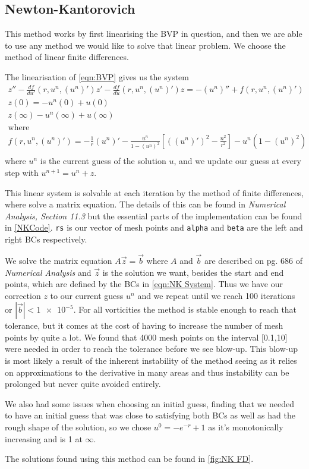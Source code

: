\documentclass[12pt]{article}
\numberwithin{equation}{section}
\numberwithin{figure}{section}
\numberwithin{table}{section}
\begin{document}
\subsection{Newton-Kantorovich}
\par This method works by first linearising the BVP in question, and then we are able to use any method we would like to solve that linear problem. We choose the method of linear finite differences. 
\par The linearisation of \autoref{eqn:BVP} gives us the system
\begin{equation}
    \begin{gathered}
        z''-\frac{df}{du'}(r,u^n, (u^n)')z'-\frac{df}{du}(r,u^n, (u^n)')z=-(u^n)''+f(r,u^n, (u^n)')\\
        z(0)=-u^n(0)+u(0)\\
        z(\infty)-u^n(\infty)+u(\infty)\\
        \text{where}\\
        f(r,u^n, (u^n)')=-\frac{1}{r}(u^n)'-\frac{u^n}{1-(u^n)^2}\left[\left((u^n)'\right)^2-\frac{n^2}{r^2}\right]-u^n(1-(u^n)^2)\\
    \end{gathered}
    \label{eqn:NK System}
\end{equation}
where $u^n$ is the current guess of the solution $u$, and we update our guess at every step with $u^{n+1}=u^n+z$. 
\par This linear system is solvable at each iteration by the method of finite differences, where solve a matrix equation. The details of this can be found in \textit{Numerical Analysis, Section 11.3} \cite{burden} but the essential parts of the implementation can be found in \autoref{NKCode}. \texttt{rs} is our vector of mesh points and \texttt{alpha} and \texttt{beta} are the left and right BCs respectively. 
\par We solve the matrix equation $A\vec{z}=\vec{b}$ where $A$ and $\vec{b}$ are described on pg. 686 of \textit{Numerical Analysis} \cite{burden} and $\vec{z}$ is the solution we want, besides the start and end points, which are defined by the BCs in \autoref{eqn:NK System}. Thus we have our correction $z$ to our current guess $u^n$ and we repeat until we reach 100 iterations or $|\vec{b}|<\num{1e-5}$. For all vorticities the method is stable enough to reach that tolerance, but it comes at the cost of having to increase the number of mesh points by quite a lot. We found that 4000 mesh points on the interval [0.1,10] were needed in order to reach the tolerance before we see blow-up. This blow-up is most likely a result of the inherent instability of the method seeing as it relies on approximations to the derivative in many areas and thus instability can be prolonged but never quite avoided entirely. 
\par We also had some issues when choosing an initial guess, finding that we needed to have an initial guess that was close to satisfying both BCs as well as had the rough shape of the solution, so we chose $u^0=-e^{-r}+1$ as it's monotonically increasing and is 1 at $\infty$.
\par The solutions found using this method can be found in \autoref{fig:NK FD}.
\end{document}
